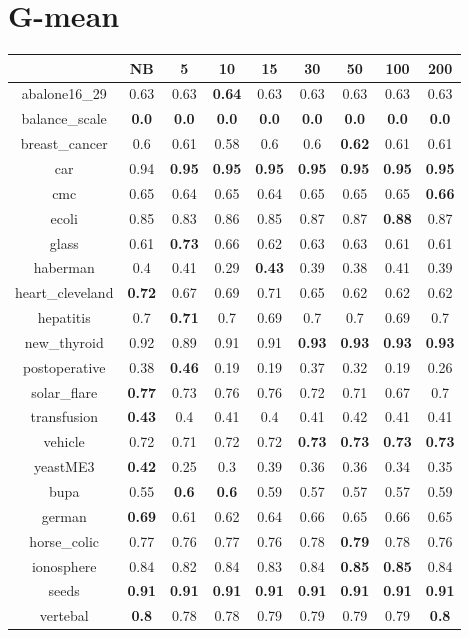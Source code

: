 \documentclass{article}%
\begin{document}
%
\section*{G{-}mean}%
\begin{tabular}{c|cccccccc}%
\hline%
&NB&5&10&15&30&50&100&200\\%
\hline%
abalone16\_29&0.63&0.63&\textbf{0.64}&0.63&0.63&0.63&0.63&0.63\\%
\hline%
balance\_scale&\textbf{0.0}&\textbf{0.0}&\textbf{0.0}&\textbf{0.0}&\textbf{0.0}&\textbf{0.0}&\textbf{0.0}&\textbf{0.0}\\%
\hline%
breast\_cancer&0.6&0.61&0.58&0.6&0.6&\textbf{0.62}&0.61&0.61\\%
\hline%
car&0.94&\textbf{0.95}&\textbf{0.95}&\textbf{0.95}&\textbf{0.95}&\textbf{0.95}&\textbf{0.95}&\textbf{0.95}\\%
\hline%
cmc&0.65&0.64&0.65&0.64&0.65&0.65&0.65&\textbf{0.66}\\%
\hline%
ecoli&0.85&0.83&0.86&0.85&0.87&0.87&\textbf{0.88}&0.87\\%
\hline%
glass&0.61&\textbf{0.73}&0.66&0.62&0.63&0.63&0.61&0.61\\%
\hline%
haberman&0.4&0.41&0.29&\textbf{0.43}&0.39&0.38&0.41&0.39\\%
\hline%
heart\_cleveland&\textbf{0.72}&0.67&0.69&0.71&0.65&0.62&0.62&0.62\\%
\hline%
hepatitis&0.7&\textbf{0.71}&0.7&0.69&0.7&0.7&0.69&0.7\\%
\hline%
new\_thyroid&0.92&0.89&0.91&0.91&\textbf{0.93}&\textbf{0.93}&\textbf{0.93}&\textbf{0.93}\\%
\hline%
postoperative&0.38&\textbf{0.46}&0.19&0.19&0.37&0.32&0.19&0.26\\%
\hline%
solar\_flare&\textbf{0.77}&0.73&0.76&0.76&0.72&0.71&0.67&0.7\\%
\hline%
transfusion&\textbf{0.43}&0.4&0.41&0.4&0.41&0.42&0.41&0.41\\%
\hline%
vehicle&0.72&0.71&0.72&0.72&\textbf{0.73}&\textbf{0.73}&\textbf{0.73}&\textbf{0.73}\\%
\hline%
yeastME3&\textbf{0.42}&0.25&0.3&0.39&0.36&0.36&0.34&0.35\\%
\hline%
bupa&0.55&\textbf{0.6}&\textbf{0.6}&0.59&0.57&0.57&0.57&0.59\\%
\hline%
german&\textbf{0.69}&0.61&0.62&0.64&0.66&0.65&0.66&0.65\\%
\hline%
horse\_colic&0.77&0.76&0.77&0.76&0.78&\textbf{0.79}&0.78&0.76\\%
\hline%
ionosphere&0.84&0.82&0.84&0.83&0.84&\textbf{0.85}&\textbf{0.85}&0.84\\%
\hline%
seeds&\textbf{0.91}&\textbf{0.91}&\textbf{0.91}&\textbf{0.91}&\textbf{0.91}&\textbf{0.91}&\textbf{0.91}&\textbf{0.91}\\%
\hline%
vertebal&\textbf{0.8}&0.78&0.78&0.79&0.79&0.79&0.79&\textbf{0.8}\\%
\hline%
\end{tabular}

%
\end{document}
